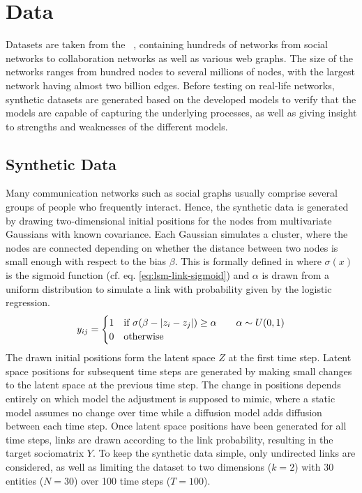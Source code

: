 \chapter{Data}\label{ch:Data}

Datasets are taken from the ~\cite{snapnets}, containing hundreds of networks from social networks to collaboration networks as well as various web graphs. The size of the networks ranges from hundred nodes to several millions of nodes, with the largest network having almost two billion edges.
Before testing on real-life networks, synthetic datasets are generated based on the developed models to verify that the models are capable of capturing the underlying processes, as well as giving insight to strengths and weaknesses of the different models. 

\section{Synthetic Data}

    Many communication networks such as social graphs usually comprise several groups of people who frequently interact. Hence, the synthetic data is generated by drawing two-dimensional initial positions for the nodes from multivariate Gaussians with known covariance. 
    Each Gaussian simulates a cluster, where the nodes are connected depending on whether the distance between two nodes is small enough with respect to the bias $\beta$. This is formally defined in  where $\sigma(x)$ is the sigmoid function (cf. eq. \ref{eq:lsm-link-sigmoid}) and $\alpha$ is drawn from a uniform distribution to simulate a link with probability given by the logistic regression.
    \begin{equation}\label{eq:synth-link}
        \sub(y) = 
        \begin{cases}
            1 & \text{if } \sigma(\beta - |z_i - z_j|) \geq \alpha \qquad \alpha\sim U(0,1) \\
            0 & \text{otherwise}
        \end{cases}
    \end{equation}
    The drawn initial positions form the latent space $Z$ at the first time step. Latent space positions for subsequent time steps are generated by making small changes to the latent space at the previous time step. The change in positions depends entirely on which model the adjustment is supposed to mimic, where a static model assumes no change over time while a diffusion model adds diffusion between each time step. Once latent space positions have been generated for all time steps, links are drawn according to the link probability, resulting in the target sociomatrix $Y$. To keep the synthetic data simple, only undirected links are considered, as well as limiting the dataset to two dimensions ($k=2$) with 30 entities ($N=30$) over 100 time steps ($T=100$).
    
